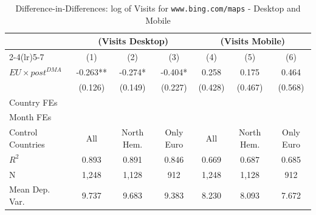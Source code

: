 \documentclass[11pt]{article}
\begin{document}
	\clearpage
	
	\begin{table}
		\centering
		\def\sym#1{\ifmmode^{#1}\else\(^{#1}\)\fi}
		\caption{\label{tab:did_desktop_mobile_bing} Difference-in-Differences: log of Visits for \texttt{www.bing.com/maps} - Desktop and Mobile}
		\begin{threeparttable}
			\begin{tabular}{lcccccc}
				\hline \noalign{\smallskip} 
				& \multicolumn{3}{c}{(Visits Desktop)} & \multicolumn{3}{c}{(Visits Mobile)}  \\ \cmidrule(lr){2-4}\cmidrule(lr){5-7}
				
				&         (1)   &         (2)   &         (3)   &         (4)   &         (5)   &         (6)   \\
				\midrule
				$ EU \times post^{DMA} $ &      -0.263** &      -0.274*  &      -0.404*  &       0.258   &       0.175   &       0.464   \\
				&     (0.126)   &     (0.149)   &     (0.227)   &     (0.428)   &     (0.467)   &     (0.568)   \\
				
				Country FEs         &  \checkmark   &  \checkmark   &  \checkmark   &  \checkmark   &  \checkmark   &  \checkmark   \\
				Month FEs           &  \checkmark   &  \checkmark   &  \checkmark   &  \checkmark   &  \checkmark   &  \checkmark   \\
				Control Countries   &         All   &  North Hem.   &   Only Euro   &         All   &  North Hem.   &   Only Euro   \\
				$ R ^2 $            &       0.893   &       0.891   &       0.846   &       0.669   &       0.687   &       0.685   \\
				N                   &       1,248   &       1,128   &         912   &       1,248   &       1,128   &         912   \\
				Mean Dep. Var.      &       9.737   &       9.683   &       9.383   &       8.230   &       8.093   &       7.672   \\
				\midrule
			\end{tabular}
			

\end{threeparttable}
\end{table}
\end{document}
